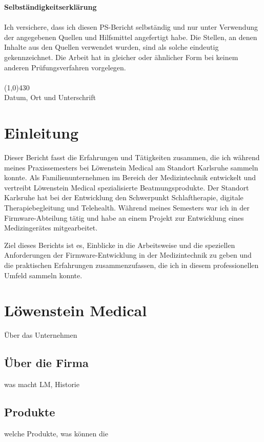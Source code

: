 \documentclass[a4paper, 12pt]{article}
\begin{document}
\newpage
\tableofcontents 
\newpage

{\bfseries Selbständigkeitserklärung}\\ \\
Ich versichere, dass ich diesen PS-Bericht selbständig und nur unter Verwendung der angegebenen
Quellen und Hilfsmittel angefertigt habe. Die Stellen, an denen Inhalte aus den Quellen verwendet
wurden, sind als solche eindeutig gekennzeichnet. Die Arbeit hat in gleicher oder ähnlicher Form bei
keinem anderen Prüfungsverfahren vorgelegen. \\
\vspace{1.0cm} \\
\line(1,0){430} \\
Datum, Ort und Unterschrift\\

\newpage
\section{Einleitung}\label{Einleitung} 
Dieser Bericht fasst die Erfahrungen und Tätigkeiten zusammen, die ich während meines Praxissemesters bei Löwenstein Medical am Standort Karlsruhe sammeln konnte. Als Familienunternehmen im Bereich der Medizintechnik entwickelt und vertreibt Löwenstein Medical spezialisierte Beatmungsprodukte. Der Standort Karlsruhe hat bei der Entwicklung den Schwerpunkt Schlaftherapie, digitale Therapiebegleitung und Telehealth. Während meines Semesters war ich in der Firmware-Abteilung tätig und habe an einem Projekt zur Entwicklung eines Medizingerätes mitgearbeitet. 

Ziel dieses Berichts ist es, Einblicke in die Arbeitsweise und die speziellen Anforderungen der Firmware-Entwicklung in der Medizintechnik zu geben und die praktischen Erfahrungen zusammenzufassen, die ich in diesem professionellen Umfeld sammeln konnte. 

\newpage
\section{Löwenstein Medical}\label{loewenstein}
Über das Unternehmen \cite{loewenstein}

\subsection{Über die Firma} %
was macht LM, Historie

\subsection{Produkte}\label{products}
welche Produkte, was können die %
\end{document}
